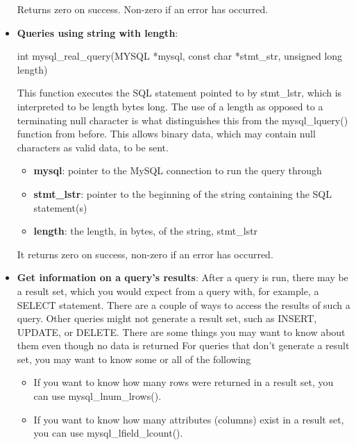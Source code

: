 \documentclass{report}
\begin{document}
\begin{itemize}
\begin{itemize}
            \end{itemize}
            \bigbreak \noindent 
            Returns zero on success. Non-zero if an error has occurred.
        \item \textbf{Queries using string with length}:
            \bigbreak \noindent 
            \begin{cppcode}
                int mysql_real_query(MYSQL *mysql,
                        const char *stmt_str,
                        unsigned long length)
            \end{cppcode}
            \bigbreak \noindent 
            This function executes the SQL statement pointed to by stmt\_lstr, which is interpreted to be length bytes long. The use of a length as opposed to a terminating null character is what distinguishes this from the mysql\_lquery() function from before. This allows binary data, which may contain null characters as valid data, to be sent.
            \begin{itemize}
                \item \textbf{mysql}: pointer to the MySQL connection to run the query through
                \item \textbf{stmt\_lstr}: pointer to the beginning of the string containing the SQL statement(s)
                \item \textbf{length}: the length, in bytes, of the string, stmt\_lstr
            \end{itemize}
            \bigbreak \noindent 
            It returns zero on success, non-zero if an error has occurred.
        \item \textbf{Get information on a query’s results}:  After a query is run, there may be a result set, which you would expect from a query with, for example, a SELECT statement. There are a couple of ways to access the results of such a query.
            \bigbreak \noindent 
            Other queries might not generate a result set, such as INSERT, UPDATE, or DELETE. There are some things you may want to know about them even though no data is returned
            \bigbreak \noindent 
            For queries that don’t generate a result set, you may want to know some or all of the following
            \begin{itemize}
                \item If you want to know how many rows were returned in a result set, you can use mysql\_lnum\_lrows().
                \item If you want to know how many attributes (columns) exist in a result set, you can use mysql\_lfield\_lcount().

\end{itemize}
\end{itemize}
\end{document}
